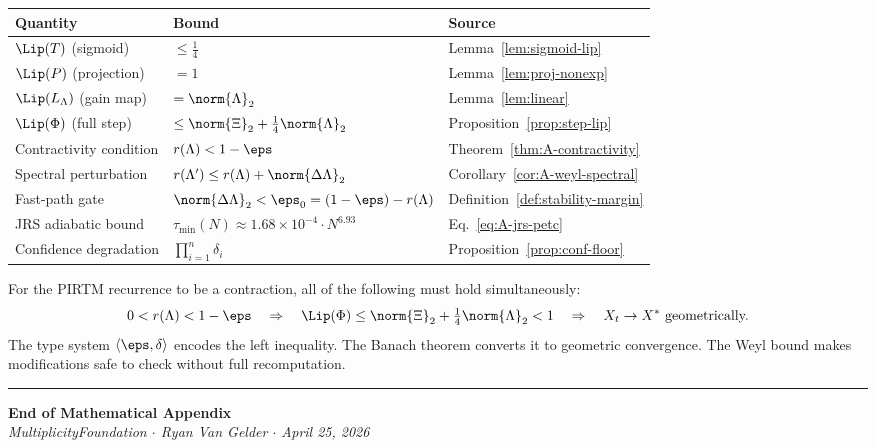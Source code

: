 \documentclass[11pt,letterpaper]{article}
\theoremstyle{remark}
\begin{document}
\begin{center}
\renewcommand{\arraystretch}{1.5}
\begin{tabular}{lll}
\toprule
\textbf{Quantity} & \textbf{Bound} & \textbf{Source} \\
\midrule
$\Lip(T)$ (sigmoid) & $\leq \tfrac{1}{4}$ & Lemma~\ref{lem:sigmoid-lip} \\
$\Lip(P)$ (projection) & $= 1$ & Lemma~\ref{lem:proj-nonexp} \\
$\Lip(L_\Lambda)$ (gain map) & $= \norm{\Lambda}_2$ & Lemma~\ref{lem:linear} \\
$\Lip(\Phi)$ (full step) & $\leq \norm{\Xi}_2 + \tfrac{1}{4}\norm{\Lambda}_2$ & Proposition~\ref{prop:step-lip} \\
Contractivity condition & $r(\Lambda) < 1 - \eps$ & Theorem~\ref{thm:A-contractivity} \\
Spectral perturbation & $r(\Lambda') \leq r(\Lambda) + \norm{\Delta\Lambda}_2$ & Corollary~\ref{cor:A-weyl-spectral} \\
Fast-path gate & $\norm{\Delta\Lambda}_2 < \eps_0 = (1-\eps) - r(\Lambda)$ & Definition~\ref{def:stability-margin} \\
JRS adiabatic bound & $\tau_{\min}(N) \approx 1.68 \times 10^{-4} \cdot N^{6.93}$ & Eq.~\eqref{eq:A-jrs-petc} \\
Confidence degradation & $\prod_{i=1}^n \delta_i$ & Proposition~\ref{prop:conf-floor} \\
\bottomrule
\end{tabular}
\end{center}

\begin{keybox}
For the PIRTM recurrence to be a contraction, all of the following
must hold simultaneously:
\[
  0 < r(\Lambda) < 1 - \eps
  \quad \Rightarrow \quad
  \Lip(\Phi) \leq \norm{\Xi}_2 + \tfrac{1}{4}\norm{\Lambda}_2 < 1
  \quad \Rightarrow \quad
  X_t \to X^* \text{ geometrically.}
\]
The type system $\langle\eps, \delta\rangle$ encodes the left inequality.
The Banach theorem converts it to geometric convergence.
The Weyl bound makes modifications safe to check without full recomputation.
\end{keybox}

\vspace{2em}
\noindent\rule{\linewidth}{0.5pt}
\begin{center}
\small
\textbf{End of Mathematical Appendix}\\[0.3em]
\textit{MultiplicityFoundation $\cdot$ Ryan Van Gelder $\cdot$ April 25, 2026}
\end{center}
\nocite{*}
  
  
\end{document}
